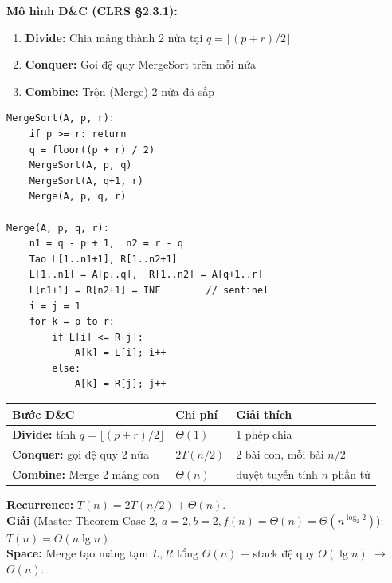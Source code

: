 \documentclass[10pt]{article}
\providecommand{\tightlist}{\setlength{\itemsep}{0pt}\setlength{\parskip}{0pt}}
\begin{document}
\textbf{Mô hình D\&C (CLRS \S 2.3.1):}

\begin{enumerate}
\def\labelenumi{\arabic{enumi}.}
\tightlist
\item
  \textbf{Divide:} Chia mảng thành 2 nửa tại
  \(q = \lfloor(p+r)/2\rfloor\)
\item
  \textbf{Conquer:} Gọi đệ quy MergeSort trên mỗi nửa
\item
  \textbf{Combine:} Trộn (Merge) 2 nửa đã sắp
\end{enumerate}

\begin{tcolorbox}[colback=gray!8, colframe=gray!50, boxrule=0.5pt, arc=2pt,
  left=6pt, right=6pt, top=4pt, bottom=4pt,
  title={\small\textbf{Pseudocode 5: Merge Sort}}]
\begin{verbatim}
MergeSort(A, p, r):
    if p >= r: return
    q = floor((p + r) / 2)
    MergeSort(A, p, q)
    MergeSort(A, q+1, r)
    Merge(A, p, q, r)

Merge(A, p, q, r):
    n1 = q - p + 1,  n2 = r - q
    Tao L[1..n1+1], R[1..n2+1]
    L[1..n1] = A[p..q],  R[1..n2] = A[q+1..r]
    L[n1+1] = R[n2+1] = INF        // sentinel
    i = j = 1
    for k = p to r:
        if L[i] <= R[j]:
            A[k] = L[i]; i++
        else:
            A[k] = R[j]; j++
\end{verbatim}
\end{tcolorbox}

\begin{tcolorbox}[colback=yellow!5, colframe=orange!50, boxrule=0.5pt, arc=2pt, title={\small\textbf{Phân tích Complexity -- Merge Sort}}]
\begin{tabular}{|l|l|l|}
\hline
\textbf{Bước D\&C} & \textbf{Chi phí} & \textbf{Giải thích} \\
\hline
\textbf{Divide:} tính $q=\lfloor(p+r)/2\rfloor$ & $\Theta(1)$ & 1 phép chia \\
\hline
\textbf{Conquer:} gọi đệ quy 2 nửa & $2T(n/2)$ & 2 bài con, mỗi bài $n/2$ \\
\hline
\textbf{Combine:} Merge 2 mảng con & $\Theta(n)$ & duyệt tuyến tính $n$ phần tử \\
\hline
\end{tabular}
\vspace{0.2cm}

\textbf{Recurrence:} $T(n) = 2T(n/2) + \Theta(n)$.\\
\textbf{Giải} (Master Theorem Case 2, $a=2, b=2, f(n)=\Theta(n)=\Theta(n^{\log_2 2})$): $T(n)=\Theta(n\lg n)$.\\
\textbf{Space:} Merge tạo mảng tạm $L, R$ tổng $\Theta(n)$ + stack đệ quy $O(\lg n)$ $\to$ $\Theta(n)$.
\end{tcolorbox}
\end{document}
